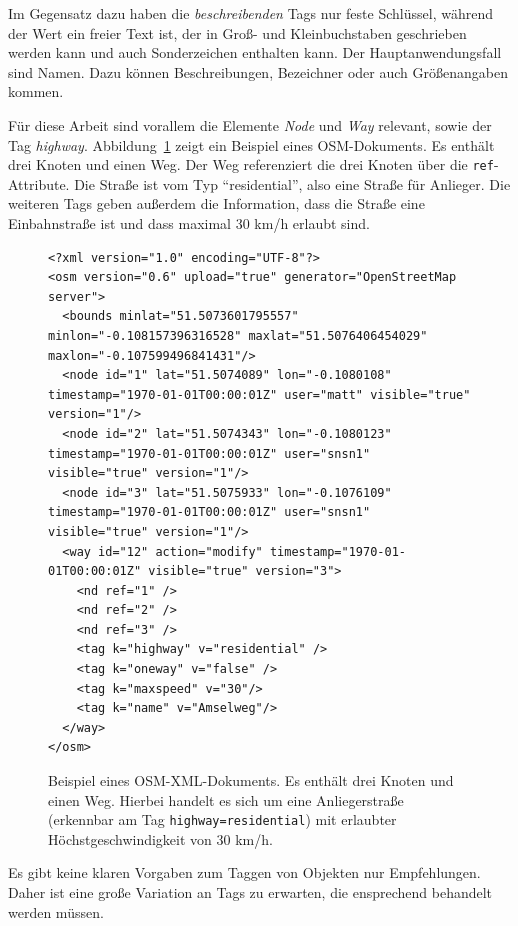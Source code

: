 Im Gegensatz dazu haben die \emph{beschreibenden} Tags nur feste Schlüssel, während der Wert ein
freier Text ist, der in Groß- und Kleinbuchstaben geschrieben werden kann und auch Sonderzeichen
enthalten kann. Der Hauptanwendungsfall sind Namen. Dazu können Beschreibungen, Bezeichner oder auch
Größenangaben kommen.

Für diese Arbeit sind vorallem die Elemente \emph{Node} und \emph{Way} relevant, sowie der Tag
\emph{highway}. Abbildung~\ref{fig:osm_xml} zeigt ein Beispiel eines OSM-Dokuments. Es enthält drei
Knoten und einen Weg. Der Weg referenziert die drei Knoten über die \texttt{ref}-Attribute. Die
Straße ist vom Typ "`residential"', also eine Straße für Anlieger. Die weiteren Tags geben
außerdem die Information, dass die Straße eine Einbahnstraße ist und dass maximal 30 km/h
erlaubt sind.

\begin{figure}[h]
    \begin{lstlisting}
<?xml version="1.0" encoding="UTF-8"?>
<osm version="0.6" upload="true" generator="OpenStreetMap server">
  <bounds minlat="51.5073601795557" minlon="-0.108157396316528" maxlat="51.5076406454029" maxlon="-0.107599496841431"/>
  <node id="1" lat="51.5074089" lon="-0.1080108" timestamp="1970-01-01T00:00:01Z" user="matt" visible="true" version="1"/>
  <node id="2" lat="51.5074343" lon="-0.1080123" timestamp="1970-01-01T00:00:01Z" user="snsn1" visible="true" version="1"/>
  <node id="3" lat="51.5075933" lon="-0.1076109" timestamp="1970-01-01T00:00:01Z" user="snsn1" visible="true" version="1"/>
  <way id="12" action="modify" timestamp="1970-01-01T00:00:01Z" visible="true" version="3">
    <nd ref="1" />
    <nd ref="2" />
    <nd ref="3" />
    <tag k="highway" v="residential" />
    <tag k="oneway" v="false" /> 
    <tag k="maxspeed" v="30"/>
    <tag k="name" v="Amselweg"/>
  </way>
</osm>
\end{lstlisting}
    \caption[OSM-XML-Beispiel]{Beispiel eines OSM-XML-Dokuments. Es enthält drei Knoten und einen
        Weg. Hierbei handelt es sich um eine Anliegerstraße (erkennbar am
        Tag \texttt{highway=residential}) mit erlaubter Höchstgeschwindigkeit von 30 km/h.}
    \label{fig:osm_xml}
\end{figure}

Es gibt keine klaren Vorgaben zum Taggen von Objekten nur Empfehlungen. Daher ist eine große
Variation an Tags zu erwarten, die ensprechend behandelt werden müssen.


